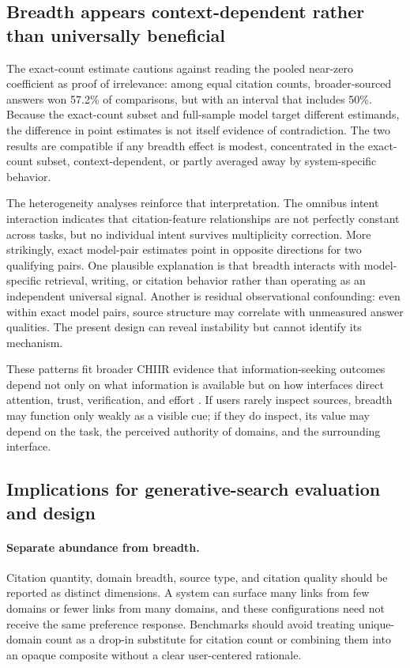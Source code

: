 \documentclass[sigconf,natbib=true,anonymous=true]{acmart}
\begin{document}
\subsection{Breadth appears context-dependent rather than universally beneficial}
The exact-count estimate cautions against reading the pooled near-zero coefficient as proof of irrelevance: among equal citation counts, broader-sourced answers won 57.2\% of comparisons, but with an interval that includes 50\%. Because the exact-count subset and full-sample model target different estimands, the difference in point estimates is not itself evidence of contradiction. The two results are compatible if any breadth effect is modest, concentrated in the exact-count subset, context-dependent, or partly averaged away by system-specific behavior.

The heterogeneity analyses reinforce that interpretation. The omnibus intent interaction indicates that citation-feature relationships are not perfectly constant across tasks, but no individual intent survives multiplicity correction. More strikingly, exact model-pair estimates point in opposite directions for two qualifying pairs. One plausible explanation is that breadth interacts with model-specific retrieval, writing, or citation behavior rather than operating as an independent universal signal. Another is residual observational confounding: even within exact model pairs, source structure may correlate with unmeasured answer qualities. The present design can reveal instability but cannot identify its mechanism.

These patterns fit broader CHIIR evidence that information-seeking outcomes depend not only on what information is available but on how interfaces direct attention, trust, verification, and effort \citep{mayerhofer2025blending,bink2026canyoutellme,he2026transparency}. If users rarely inspect sources, breadth may function only weakly as a visible cue; if they do inspect, its value may depend on the task, the perceived authority of domains, and the surrounding interface.

\subsection{Implications for generative-search evaluation and design}
\paragraph{Separate abundance from breadth.}
Citation quantity, domain breadth, source type, and citation quality should be reported as distinct dimensions. A system can surface many links from few domains or fewer links from many domains, and these configurations need not receive the same preference response. Benchmarks should avoid treating unique-domain count as a drop-in substitute for citation count or combining them into an opaque composite without a clear user-centered rationale.
\end{document}
